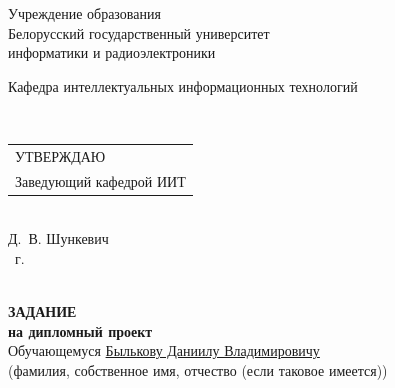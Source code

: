 {
  \thispagestyle{empty}
  \setlength{\parindent}{0em}

  \newcommand{\lineunderscore}{\uline{\hspace*{\fill}}}

  \begin{center}
    Учреждение образования\\
    Белорусский государственный университет\\
    информатики и радиоэлектроники\\[0.5em]
  
  \begin{center}
  \begin{minipage}{\textwidth}
      Кафедра интеллектуальных информационных технологий
  \end{minipage}\\[2em]
\end{center}

  \begin{minipage}{\textwidth}
    \begin{flushright}
      \begin{tabular}{@{}l@{}}
        УТВЕРЖДАЮ\\[0.5em]
        Заведующий кафедрой ИИТ
      \end{tabular}\\[0.7em]
      \underline{\hspace*{5.3em}} Д.~В. Шункевич\\ [0.5em]
      \underline{\hspace*{1.9em}} \underline{\hspace*{7.8em}} \the\year{}~г.
    \end{flushright}
  \end{minipage}\\[2em]

  \textbf{ЗАДАНИЕ} \\
  \textbf{на дипломный проект}\\[1em]

  Обучающемуся \uline{\hspace*{2em}}\uline{Былькову Даниилу Владимировичу}\lineunderscore \\
  {\footnotesize\hspace{9em}(фамилия, собственное имя, отчество (если таковое имеется))}\\
  

\end{center}}
